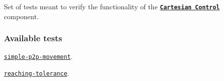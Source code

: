 Set of tests meant to verify the functionality of the \href{http://wiki.icub.org/iCub/main/dox/html/icub_cartesian_interface.html}{\tt {\bfseries Cartesian Control}} component.

\subsubsection*{Available tests}


\begin{DoxyItemize}
\item \href{https://github.com/robotology/icub-tests/blob/master/src/cartesian-control/simple-p2p-movement}{\tt {\ttfamily simple-\/p2p-\/movement}}.
\item \href{https://github.com/robotology/icub-tests/blob/master/src/cartesian-control/reaching-tolerance}{\tt {\ttfamily reaching-\/tolerance}}. 
\end{DoxyItemize}